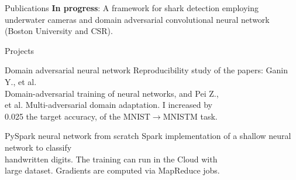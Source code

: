 \documentclass{resume}
\begin{document}
\begin{multicols}{2}
	\begin{rSection}{\Large Publications}
		\textbf{In progress}:  A framework for shark detection employing underwater cameras and domain adversarial convolutional neural network (Boston University and CSR). 
	\end{rSection}

	\begin{rSection}{\Large Projects}
	
		\begin{project}{Domain adversarial neural network}{}{}{
			Reproducibility study of the papers: Ganin Y., et al. \\Domain-adversarial training of neural networks, and Pei Z.,\\ et al. Multi-adversarial domain adaptation.
			I increased by \\0.025 the target accuracy, of the MNIST$\rightarrow$MNISTM task.
		}
		\end{project}
	
		\begin{project}{PySpark neural network from scratch}{}{}{
		 	Spark implementation of a shallow neural network to classify \\handwritten digits. The training can run in the Cloud with \\large dataset. Gradients are computed via MapReduce jobs.
		}
		\end{project}
		

\end{rSection}
\end{multicols}
\end{document}
